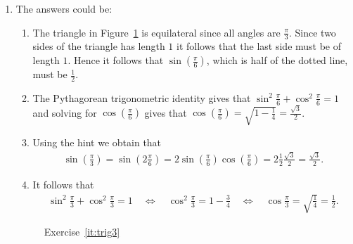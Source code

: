 \begin{enumerate}
	\item \label{it:trig3} The answers could be:

\begin{enumerate}
	\item The triangle in Figure~\ref{fig:trig3} is equilateral since all angles are $\frac{\pi}{3}$. Since two sides of the triangle has length $1$ it follows that the last side must be of length $1$. Hence it follows that $\sin(\frac{\pi}{6})$, which is half of the dotted line, must be $\frac{1}{2}$.
	
	\item The Pythagorean trigonometric identity gives that $\sin^2 \frac{\pi}{6}+\cos^2\frac{\pi}{6}=1$ and solving for $\cos(\frac{\pi}{6})$ gives that $ \cos(\frac{\pi}{6})=\sqrt{1-\frac{1}{4}}=\frac{\sqrt{3}}{2} $.
	
	\item Using the hint we obtain that
	\begin{align*}
	\sin(\frac{\pi}{3})=\sin(2\frac{\pi}{6}) =2\sin(\frac{\pi}{6})\cos(\frac{\pi}{6})=2\frac{1}{2}\frac{\sqrt{3}}{2}=\frac{\sqrt{3}}{2}.
	\end{align*}
	
	\item It follows that
	\begin{align*}
	\sin^2 \frac{\pi}{3}+ \cos^2\frac{\pi}{3}=1\quad \Leftrightarrow\quad \cos^2\frac{\pi}{3}=1-\frac{3}{4}\quad \Leftrightarrow\quad \cos\frac{\pi}{3}=\sqrt{\frac{1}{4}}=\frac{1}{2}.
	\end{align*}
	
\end{enumerate}

\begin{figure}
	\centering
	\caption{Exercise~\ref{it:trig3}}
	\label{fig:trig3}
\end{figure}


\end{enumerate}
